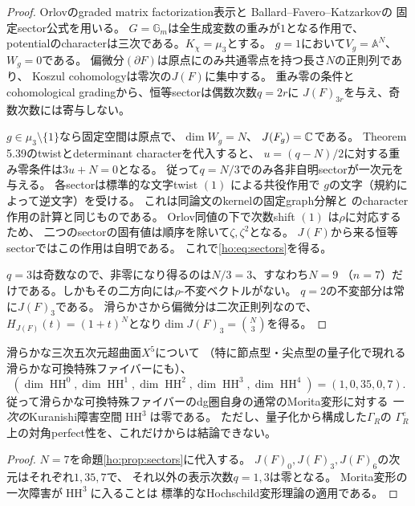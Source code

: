 \begin{proof}
Orlovのgraded matrix factorization表示と
Ballard--Favero--Katzarkov\cite[Theorem 5.39, pp.~82--85]{BFKER}の
固定sector公式を用いる。
$G=\mathbb G_m$は全生成変数の重みが$1$となる作用で、
potentialのcharacterは三次である。$K_\chi=\mu_3$とする。
$g=1$において$V_g=\mathbb A^N$、$W_g=0$である。
偏微分$(\partial F)$は原点にのみ共通零点を持つ長さ$N$の正則列であり、
Koszul cohomologyは零次の$J(F)$に集中する。
重み零の条件とcohomological gradingから、恒等sectorは偶数次数$q=2r$に
$J(F)_{3r}$を与え、奇数次数には寄与しない。

$g\in\mu_3\setminus\{1\}$なら固定空間は原点で、$\dim W_g=N$、
$J(F_g)=\mathbb C$である。
Theorem 5.39のtwistとdeterminant characterを代入すると、
$u=(q-N)/2$に対する重み零条件は$3u+N=0$となる。
従って$q=N/3$でのみ各非自明sectorが一次元を与える。
各sectorは標準的な文字twist $(1)$ による共役作用で
$g$の文字（規約によって逆文字）を受ける。
これは同論文のkernelの固定graph分解と
\cite[Theorem 6.5]{BFKER}のcharacter作用の計算と同じものである。
Orlov同値の下で次数shift $(1)$ は$\rho$に対応するため、
二つのsectorの固有値は順序を除いて$\zeta,\zeta^2$となる。
$J(F)$から来る恒等sectorではこの作用は自明である。
これで\eqref{ho:eq:sectors}を得る。

$q=3$は奇数なので、非零になり得るのは$N/3=3$、すなわち$N=9$
（$n=7$）だけである。しかもその二方向には$\rho$-不変ベクトルがない。
$q=2$の不変部分は常に$J(F)_3$である。
滑らかさから偏微分は二次正則列なので、
$H_{J(F)}(t)=(1+t)^N$となり$\dim J(F)_3=\binom N3$を得る。
\end{proof}

\begin{corollary}\label{ho:cor:fivefold}
滑らかな三次五次元超曲面$X^5$について
（特に節点型・尖点型の量子化で現れる滑らかな可換特殊ファイバーにも）、
\[
 (\dim\operatorname{HH}^0,\dim\operatorname{HH}^1,
 \dim\operatorname{HH}^2,\dim\operatorname{HH}^3,
 \dim\operatorname{HH}^4)=(1,0,35,0,7).
 \tag{F5}\label{ho:eq:fivefold}
\]
従って滑らかな可換特殊ファイバーのdg圏自身の通常のMorita変形に対する
\emph{一次の}Kuranishi障害空間$\operatorname{HH}^3$は零である。
ただし、量子化から構成した$\Gamma_R$の
$\Gamma_R^e$上の対角perfect性を、これだけからは結論できない。
\end{corollary}
\begin{proof}
$N=7$を命題\ref{ho:prop:sectors}に代入する。
$J(F)_0,J(F)_3,J(F)_6$の次元はそれぞれ$1,35,7$で、
それ以外の表示次数$q=1,3$は零となる。
Morita変形の一次障害が$\operatorname{HH}^3$に入ることは
標準的なHochschild変形理論の適用である。
\end{proof}

